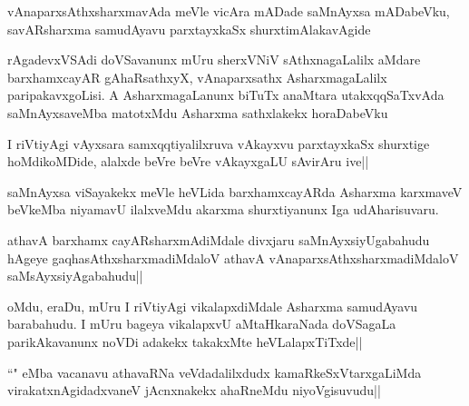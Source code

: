 \begin{artha}
vAnaparxsAthxsharxmavAda meVle vicAra mADade saMnAyxsa mADabeVku, savARsharxma samudAyavu parxtayxkaSx shurxtimAlakavAgide
\end{artha}


\begin{artha}
rAgadevxVSAdi doVSavanunx mUru sherxVNiV sAthxnagaLalilx aMdare barxhamxcayAR gAhaRsathxyX, vAnaparxsathx AsharxmagaLalilx paripakavxgoLisi. A AsharxmagaLanunx biTuTx anaMtara utakxqqSaTxvAda saMnAyxsaveMba matotxMdu Asharxma sathxlakekx horaDabeVku
\end{artha}

\begin{artha}%
I riVtiyAgi vAyxsara samxqqtiyalilxruva vAkayxvu parxtayxkaSx shurxtige hoMdikoMDide, alalxde beVre beVre vAkayxgaLU sAvirAru ive||

saMnAyxsa viSayakekx meVle heVLida barxhamxcayARda Asharxma karxmaveV beVkeMba niyamavU ilalxveMdu akarxma shurxtiyanunx Iga udAharisuvaru.
\end{artha}

\begin{artha}
athavA barxhamx cayARsharxmAdiMdale divxjaru saMnAyxsiyUgabahudu hAgeye gaqhasAthxsharxmadiMdaloV athavA vAnaparxsAthxsharxmadiMdaloV saMsAyxsiyAgabahudu||
\end{artha}

\begin{artha}
oMdu, eraDu, mUru I riVtiyAgi vikalapxdiMdale Asharxma samudAyavu barabahudu. I mUru bageya vikalapxvU aMtaHkaraNada doVSagaLa parikAkavanunx noVDi adakekx takakxMte heVLalapxTiTxde||
\end{artha}

\begin{artha}
``\stext " eMba vacanavu athavaRNa veVdadalilxdudx kamaRkeSxVtarxgaLiMda virakatxnAgidadxvaneV jAcnxnakekx ahaRneMdu niyoVgisuvudu||
\end{artha}

